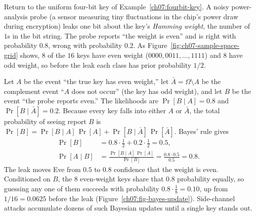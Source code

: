 \begin{example}
\label{ch07:bayes-sidechannel}
Return to the uniform four-bit key of Example~\ref{ch07:fourbit-key}. A noisy power-analysis probe (a sensor measuring tiny fluctuations in the chip's power draw during encryption) leaks one bit about the key's \emph{Hamming weight}, the number of $1$s in the bit string. The probe reports ``the weight is even'' and is right with probability $0.8$, wrong with probability $0.2$. As Figure~\ref{fig:ch07-sample-space-grid} shows, $8$ of the $16$ keys have even weight ($0000, 0011, \ldots, 1111$) and $8$ have odd weight, so before the leak each class has prior probability $1/2$.

Let $A$ be the event ``the true key has even weight,'' let $\bar A = \Omega \setminus A$ be the complement event ``$A$ does not occur'' (the key has odd weight), and let $B$ be the event ``the probe reports even.'' The likelihoods are $\Pr[B \mid A] = 0.8$ and $\Pr[B \mid \bar A] = 0.2$. Because every key falls into either $A$ or $\bar A$, the total probability of seeing report $B$ is $\Pr[B] = \Pr[B \mid A]\,\Pr[A] + \Pr[B \mid \bar A]\,\Pr[\bar A]$. Bayes' rule gives
\begin{align*}
  \Pr[B] &= 0.8 \cdot \frac{1}{2} + 0.2 \cdot \frac{1}{2} = 0.5, \\
  \Pr[A \mid B] &= \frac{\Pr[B \mid A]\,\Pr[A]}{\Pr[B]} = \frac{0.8 \cdot 0.5}{0.5} = 0.8.
\end{align*}
The leak moves Eve from $0.5$ to $0.8$ confidence that the weight is even. Conditioned on $B$, the $8$ even-weight keys share that $0.8$ probability equally, so guessing any one of them succeeds with probability $0.8 \cdot \frac{1}{8} = 0.10$, up from $1/16 = 0.0625$ before the leak (Figure~\ref{ch07:fig-bayes-update}). Side-channel attacks accumulate dozens of such Bayesian updates until a single key stands out.
\end{example}

